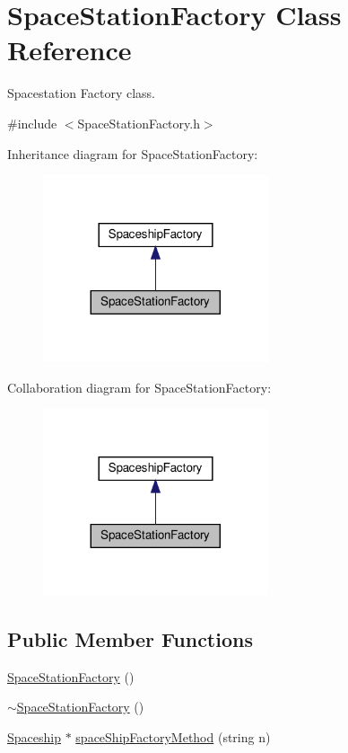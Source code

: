 \hypertarget{classSpaceStationFactory}{}\section{Space\+Station\+Factory Class Reference}
\label{classSpaceStationFactory}


Spacestation Factory class.  




{\ttfamily \#include $<$Space\+Station\+Factory.\+h$>$}



Inheritance diagram for Space\+Station\+Factory\+:\nopagebreak
\begin{figure}[H]
\begin{center}
\leavevmode
\includegraphics[width=188pt]{classSpaceStationFactory__inherit__graph}
\end{center}
\end{figure}


Collaboration diagram for Space\+Station\+Factory\+:\nopagebreak
\begin{figure}[H]
\begin{center}
\leavevmode
\includegraphics[width=188pt]{classSpaceStationFactory__coll__graph}
\end{center}
\end{figure}
\subsection*{Public Member Functions}
\begin{DoxyCompactItemize}
\item 
\hyperlink{classSpaceStationFactory_a6f17e032052e7bdd507a52947dbd7362}{Space\+Station\+Factory} ()
\item 
\hyperlink{classSpaceStationFactory_ae6428ec2e2302246b5e283ff6fee31cd}{$\sim$\+Space\+Station\+Factory} ()
\item 
\hyperlink{classSpaceship}{Spaceship} $\ast$ \hyperlink{classSpaceStationFactory_a21bbba99fbe7a2edeb3e63177d7f2e1c}{space\+Ship\+Factory\+Method} (string n)
\end{DoxyCompactItemize}



